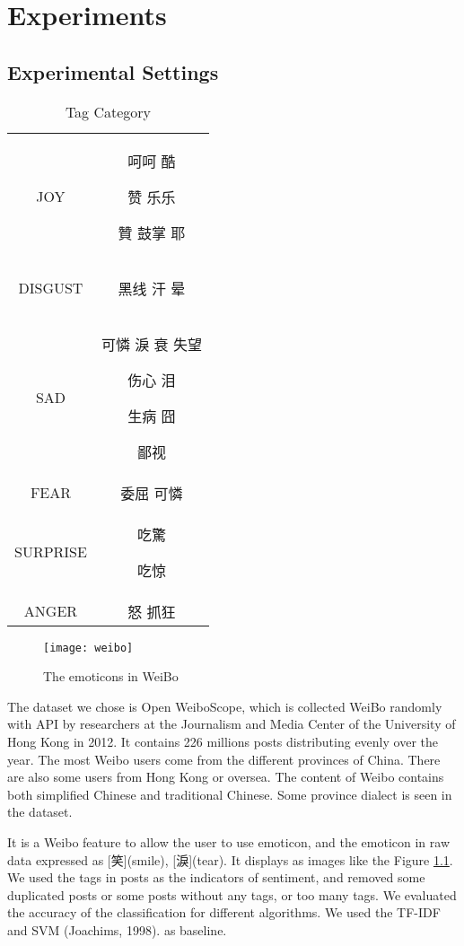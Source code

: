 \chapter{Experiments}

\section{Experimental Settings}

\begin{table}[]
\centering
\caption{Tag Category}
\label{CategoryTable}
\begin{tabular}{|c|c|}
\hline
JOY  & 呵呵 酷 \begin{CJK}{UTF8}{gbsn}赞 乐乐\end{CJK} 贊 鼓掌 耶 \\
DISGUST & \begin{CJK}{UTF8}{gbsn}黑线 汗 晕\end{CJK} \\
SAD &   可憐 淚 衰 失望 \begin{CJK}{UTF8}{gbsn}伤心 泪\end{CJK} 生病 囧 \begin{CJK}{UTF8}{gbsn}鄙视\end{CJK}  \\
FEAR &  委屈  可憐 \\
SURPRISE &  吃驚  \begin{CJK}{UTF8}{gbsn}吃惊\end{CJK} \\
ANGER & 怒 抓狂 \\
\hline
\end{tabular}
\end{table}

\begin{figure}[h]
    \centering
	\texttt{[image: weibo]}
    \caption{The emoticons in WeiBo}
    \label{fig:weibo}
\end{figure}

The dataset we chose is Open WeiboScope\cite{fu2013reality}, which is collected WeiBo randomly with API by researchers at the Journalism and Media Center of the University of Hong Kong in 2012. 
It contains 226 millions posts distributing evenly over the year.  
The most Weibo users come from the different provinces of China. There are also some users from Hong Kong or oversea. 
The content of Weibo contains both simplified Chinese and traditional Chinese. Some province dialect is seen in the dataset.

It is a Weibo feature to allow the user to use emoticon, 
and the emoticon in raw data expressed as [笑](smile), [淚](tear). It displays as images like the Figure \ref{fig:weibo}. 
We used the tags in posts as the indicators of sentiment, and removed some duplicated posts or some posts without any tags, or too many tags. 
We evaluated the accuracy of the classification for different algorithms. We used the TF-IDF and SVM (Joachims, 1998). as baseline.

